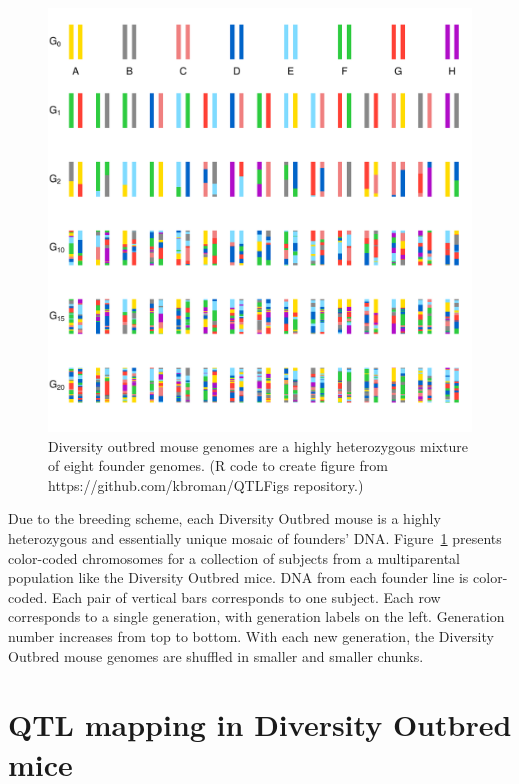 \documentclass[oneside]{book}\usepackage[]{graphicx}\usepackage[]{color}
\makeatletter
\def\maxwidth{ %
  \ifdim\Gin@nat@width>\linewidth
    \linewidth
  \else
    \Gin@nat@width
  \fi
}
\newenvironment{knitrout}{}{} %
\def\maxwidth{\ifdim\Gin@nat@width>\linewidth\linewidth\else\Gin@nat@width\fi}
\makeatother
\begin{document}
\begin{knitrout}
\color{fgcolor}\begin{figure}
\includegraphics[width=\maxwidth]{figure/do-1} \caption[Diversity outbred mouse genomes are a highly heterozygous mixture of eight founder genomes]{Diversity outbred mouse genomes are a highly heterozygous mixture of eight founder genomes. (R code to create figure from https://github.com/kbroman/QTLFigs repository.)}\label{fig:do}
\end{figure}


\end{knitrout}

Due to the breeding scheme, each Diversity Outbred mouse is a highly
heterozygous and essentially unique mosaic of
founders' DNA. Figure~\ref{fig:do} presents color-coded chromosomes for a collection of 
subjects from a multiparental population like the Diversity Outbred mice. DNA from each founder 
line is color-coded. Each pair of vertical bars corresponds to one subject. Each row corresponds to a single generation, with generation labels on the left. Generation number increases from top to bottom. 
With each new generation, the Diversity Outbred mouse genomes are shuffled
in smaller and smaller chunks.

\section{QTL mapping in Diversity Outbred mice}\label{sec:do-qtl}
\end{document}
